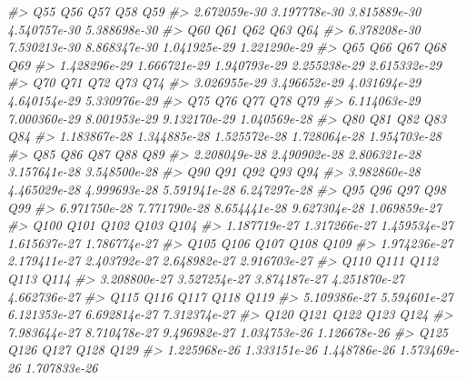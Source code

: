 \documentclass[]{article}
\newenvironment{Shaded}{\begin{snugshade}}{\end{snugshade}}
\newcommand{\CommentTok}[1]{\textcolor[rgb]{0.56,0.35,0.01}{\textit{#1}}}
\begin{document}
\begin{Shaded}
\begin{Highlighting}[]
\CommentTok{#>           Q55           Q56           Q57           Q58           Q59 }
\CommentTok{#>  2.672059e-30  3.197778e-30  3.815889e-30  4.540757e-30  5.388698e-30 }
\CommentTok{#>           Q60           Q61           Q62           Q63           Q64 }
\CommentTok{#>  6.378208e-30  7.530213e-30  8.868347e-30  1.041925e-29  1.221290e-29 }
\CommentTok{#>           Q65           Q66           Q67           Q68           Q69 }
\CommentTok{#>  1.428296e-29  1.666721e-29  1.940793e-29  2.255238e-29  2.615332e-29 }
\CommentTok{#>           Q70           Q71           Q72           Q73           Q74 }
\CommentTok{#>  3.026955e-29  3.496652e-29  4.031694e-29  4.640154e-29  5.330976e-29 }
\CommentTok{#>           Q75           Q76           Q77           Q78           Q79 }
\CommentTok{#>  6.114063e-29  7.000360e-29  8.001953e-29  9.132170e-29  1.040569e-28 }
\CommentTok{#>           Q80           Q81           Q82           Q83           Q84 }
\CommentTok{#>  1.183867e-28  1.344885e-28  1.525572e-28  1.728064e-28  1.954703e-28 }
\CommentTok{#>           Q85           Q86           Q87           Q88           Q89 }
\CommentTok{#>  2.208049e-28  2.490902e-28  2.806321e-28  3.157641e-28  3.548500e-28 }
\CommentTok{#>           Q90           Q91           Q92           Q93           Q94 }
\CommentTok{#>  3.982860e-28  4.465029e-28  4.999693e-28  5.591941e-28  6.247297e-28 }
\CommentTok{#>           Q95           Q96           Q97           Q98           Q99 }
\CommentTok{#>  6.971750e-28  7.771790e-28  8.654441e-28  9.627304e-28  1.069859e-27 }
\CommentTok{#>          Q100          Q101          Q102          Q103          Q104 }
\CommentTok{#>  1.187719e-27  1.317266e-27  1.459534e-27  1.615637e-27  1.786774e-27 }
\CommentTok{#>          Q105          Q106          Q107          Q108          Q109 }
\CommentTok{#>  1.974236e-27  2.179411e-27  2.403792e-27  2.648982e-27  2.916703e-27 }
\CommentTok{#>          Q110          Q111          Q112          Q113          Q114 }
\CommentTok{#>  3.208800e-27  3.527254e-27  3.874187e-27  4.251870e-27  4.662736e-27 }
\CommentTok{#>          Q115          Q116          Q117          Q118          Q119 }
\CommentTok{#>  5.109386e-27  5.594601e-27  6.121353e-27  6.692814e-27  7.312374e-27 }
\CommentTok{#>          Q120          Q121          Q122          Q123          Q124 }
\CommentTok{#>  7.983644e-27  8.710478e-27  9.496982e-27  1.034753e-26  1.126678e-26 }
\CommentTok{#>          Q125          Q126          Q127          Q128          Q129 }
\CommentTok{#>  1.225968e-26  1.333151e-26  1.448786e-26  1.573469e-26  1.707833e-26 }

\end{Highlighting}
\end{Shaded}
\end{document}
